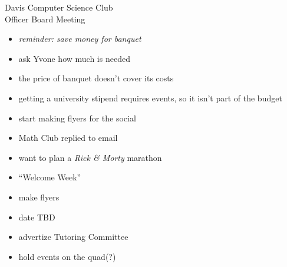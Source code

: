 \documentclass{article}
\begin{document}
\begin{Minutes}{Davis Computer Science Club\\Officer Board Meeting}
\missingExcused{}
\missingNoExcuse{}




\maketitle
{}
\begin{itemize}
\item \emph{reminder: save money for banquet}
\item ask Yvone how much is needed
\item the price of banquet doesn't cover its costs
\end{itemize}
\begin{itemize}
\item getting a university stipend requires events, so it isn't part of the budget
\end{itemize}
\begin{itemize}
\item start making flyers for the social
\end{itemize}
\begin{itemize}
\item Math Club replied to email
\item want to plan a \textit{Rick \& Morty} marathon
\end{itemize}

\begin{itemize}
\item ``Welcome Week''
\item make flyers
\item date TBD
\item advertize Tutoring Committee
\item hold events on the quad(?)
\end{itemize}


\end{Minutes}
\end{document}
